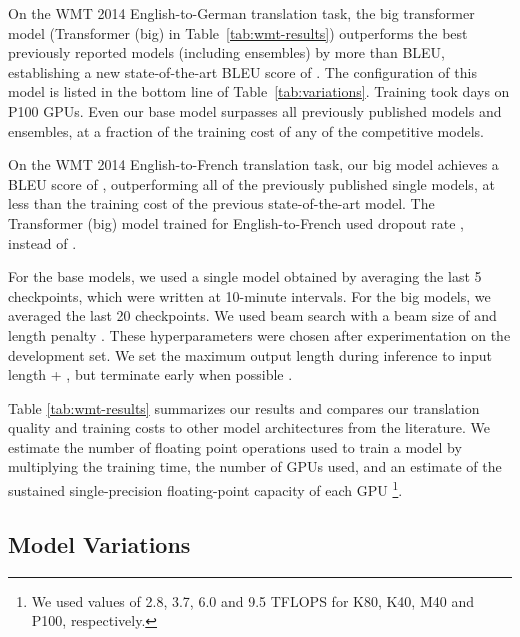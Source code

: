 \documentclass{article}
\begin{document}
On the WMT 2014 English-to-German translation task, the big transformer model (Transformer (big) in Table~\ref{tab:wmt-results}) outperforms the best previously reported models (including ensembles) by more than  BLEU, establishing a new state-of-the-art BLEU score of .  The configuration of this model is listed in the bottom line of Table~\ref{tab:variations}.  Training took  days on  P100 GPUs.  Even our base model surpasses all previously published models and ensembles, at a fraction of the training cost of any of the competitive models.

On the WMT 2014 English-to-French translation task, our big model achieves a BLEU score of , outperforming all of the previously published single models, at less than  the training cost of the previous state-of-the-art model. The Transformer (big) model trained for English-to-French used dropout rate , instead of .

For the base models, we used a single model obtained by averaging the last 5 checkpoints, which were written at 10-minute intervals.  For the big models, we averaged the last 20 checkpoints. We used beam search with a beam size of  and length penalty  \citep{wu2016google}.  These hyperparameters were chosen after experimentation on the development set.  We set the maximum output length during inference to input length + , but terminate early when possible \citep{wu2016google}.

Table \ref{tab:wmt-results} summarizes our results and compares our translation quality and training costs to other model architectures from the literature.  We estimate the number of floating point operations used to train a model by multiplying the training time, the number of GPUs used, and an estimate of the sustained single-precision floating-point capacity of each GPU \footnote{We used values of 2.8, 3.7, 6.0 and 9.5 TFLOPS for K80, K40, M40 and P100, respectively.}.


\subsection{Model Variations}
\end{document}
